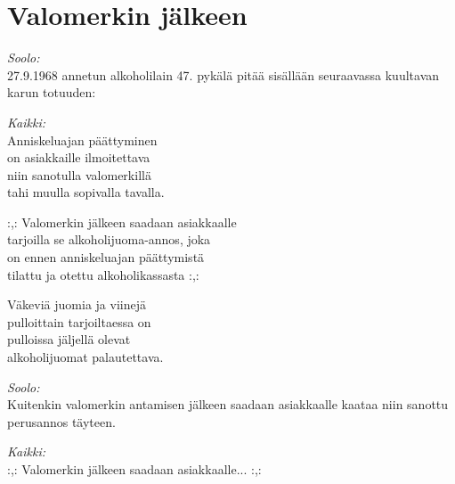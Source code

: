 \section{Valomerkin jälkeen}

\textit{Soolo:}\\
27.9.1968 annetun alkoholilain 47. pykälä pitää sisällään seuraavassa kuultavan karun totuuden:

\textit{Kaikki:}\\
Anniskeluajan päättyminen\\
on asiakkaille ilmoitettava\\
niin sanotulla valomerkillä\\
tahi muulla sopivalla tavalla.

:,: Valomerkin jälkeen saadaan asiakkaalle\\
tarjoilla se alkoholijuoma-annos, joka\\
on ennen anniskeluajan päättymistä\\
tilattu ja otettu alkoholikassasta :,:

Väkeviä juomia ja viinejä\\
pulloittain tarjoiltaessa on\\
pulloissa jäljellä olevat\\
alkoholijuomat palautettava.

\textit{Soolo:}\\
Kuitenkin valomerkin antamisen jälkeen saadaan asiakkaalle
kaataa niin sanottu perusannos täyteen.

\textit{Kaikki:}\\
:,: Valomerkin jälkeen saadaan asiakkaalle... :,: